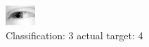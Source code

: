 \begin{figure}[h!]
\begin{center}
\includegraphics[width=0.60\columnwidth]{figures/ID2540_class_3_target_4.png}
\end{center}
\caption{ Classification: 3 actual target: 4}
\label{fig:ID2540_class_3_target_4}
\end{figure}

